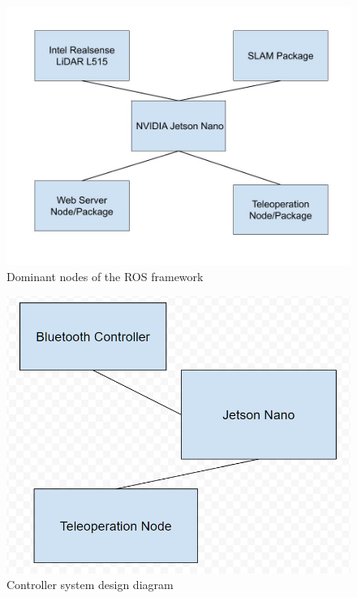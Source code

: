 \documentclass[a4paper, 10pt]{article}
\begin{document}
        \begin{figure} [h]
			\centering
			\includegraphics[scale=0.35]{Photos/Dominant Nodes in ROS}
			\caption{Dominant nodes of the ROS framework}
			\label{dominant_nodes}
		\end{figure}

        \begin{figure} [!h]
			\centering
			\includegraphics[scale=0.35]{Photos/controller node}
			\caption{Controller system design diagram}
			\label{control_nodes}
		\end{figure}
		
\end{document}
